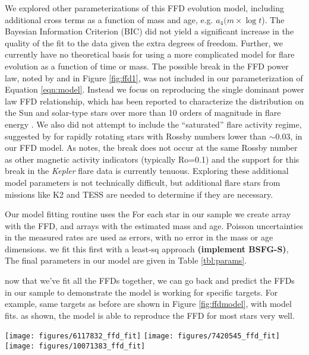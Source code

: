 \documentclass[preprint2]{aastex62}
\newcommand{\Kepler}{\textsl{Kepler}\xspace}
\begin{document}
We explored other parameterizations of this FFD evolution model, including additional cross terms as a function of mass and age, e.g. $a_4 (m \times \log t$). The Bayesian Information Criterion (BIC) did not yield a significant increase in the quality of the fit to the data given the extra degrees of freedom. Further, we currently have no theoretical basis for using a more complicated model for flare evolution as a function of time or mass. The possible break in the FFD power law, noted by \citet{davenport2016} and in Figure \ref{fig:ffd1}, was not included in our parameterization of Equation \ref{eqn:model}. Instead we focus on reproducing the single dominant power law FFD relationship, which has been reported to characterize the distribution on the Sun and solar-type stars over more than 10 orders of magnitude in flare energy \citep[e.g. Fig. 9 from][]{shibayama2013}. We also did not attempt to include the ``saturated'' flare activity regime, suggested by \citet{davenport2016} for rapidly rotating stars with Rossby numbers lower than $\sim$0.03, in our FFD model. As \citet{davenport2016} notes, the break does not occur at the same Rossby number as other magnetic activity indicators (typically Ro=0.1) and the support for this break in the \Kepler flare data is currently tenuous. Exploring these additional model parameters is not technically difficult, but additional flare stars from missions like K2 and TESS are needed to determine if they are necessary. 


Our model fitting routine uses the
For each star in our sample we create  array with the FFD, and arrays with the estimated mass and age. Poisson uncertainties in the measured rates are used as errors, with no error in the mass or age dimensions.
we fit this first with a least-sq approach {\bf(implement BSFG-S)}, %
The final parameters in our model are given in Table \ref{tbl:params}.





now that we've fit all the FFDs together, we can go back and predict the FFDs in our sample to demonstrate the model is working for specific targets. For example, same targets as before are shown in Figure \ref{fig:ffdmodel}, with model fits. as shown, the model is able to reproduce the FFD for most stars very well.


\begin{figure*}[!t]
\centering
\texttt{[image: figures/6117832\_ffd\_fit]}
\texttt{[image: figures/7420545\_ffd\_fit]}
\texttt{[image: figures/10071383\_ffd\_fit]}
\caption{
Flare frequency distributions as shown from Figure \ref{fig:ffd} (black line), but with the resulting flare activity model from Equation \ref{eqn:model} evaluated for each star shown (red line). Note this model was not fit for each star's FFD individually, but instead was fit to our entire sample.}
\label{fig:ffdmodel}
\end{figure*}
\end{document}
